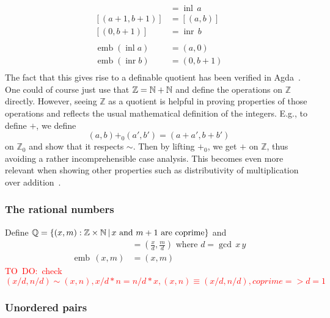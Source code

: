 \documentclass{llncs}
\newcommand{\bocks}[1]{[#1]}
\DeclareMathOperator*{\emb}{\mathrm{emb}}
\newcommand{\Z}{\mathbb{Z}}
\newcommand{\todo}[1]{\textcolor{red}{TO~DO:~#1}}
\DeclareMathOperator*{\inl}{\mathop{\mathrm{inl}}}
\DeclareMathOperator*{\inr}{\mathop{\mathrm{inr}}}
\begin{document}
\begin{align*}
\bocks{(a,0)} &= \inl\,a\\
\bocks{(a+1,b+1)} &= \bocks{(a,b)}\\
\bocks{(0,b+1)} &= \inr\,b\\\\
\emb (\inl a) &= (a,0)\\
\emb (\inr b) &= (0,b+1)\\
\end{align*}
The fact that this gives rise to a definable quotient has been verified in Agda~\cite{nuo:report:2010}.
 One could of course just use that $\Z=\nat + \nat$ and define the operations on $\Z$ directly. However, seeing  $\Z$ as a quotient is helpful in proving properties of those operations and reflects the usual mathematical definition of the integers. E.g., to define $+$, we define 
\[(a,b){+_0}(a', b')= (a+a',b+b')\]
on $\Z_0$ and show that it respects $\sim$. Then by lifting $+_0$, we get $+$ on $\Z$, thus avoiding a rather incomprehensible case analysis. This becomes even more relevant when showing other properties such as distributivity of multiplication over addition~\cite{nuo:report:2010}.

\subsubsection*{The rational numbers}

Define $\Q = \set{(x,m):\Z\times\nat \,|\, x \text{ and } m+1 \text{ are coprime}}$ and
\begin{align*}
\bocks{(x,m)}&=\left(\frac x d, \frac m d\right) \text{ where } d = \gcd\,x \,y\\
\emb \,(x,m) &= (x,m)
\end{align*}
\todo{check $(x/d,n/d)\sim(x,n), x/d*n= n/d*x, (x,n)\equiv(x/d,n/d),coprime=>d=1$}

\subsubsection*{Unordered pairs}
\end{document}
